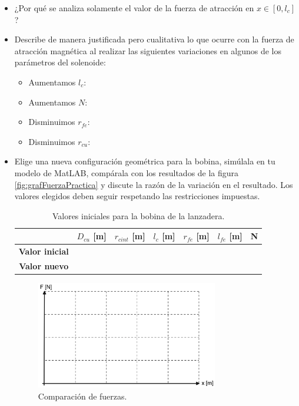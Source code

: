 \begin{itemize}
    \item ¿Por qué se analiza solamente el valor de la fuerza de atracción en \(x \in [0, l_c]\)?
    \vspace{2cm}
    \item Describe de manera justificada pero cualitativa lo que ocurre con la fuerza de atracción magnética al realizar las siguientes variaciones en algunos de los parámetros del solenoide:
    \begin{itemize}
        \item Aumentamos \(l_c\):
        \item Aumentamos \(N\):
        \item Disminuimos \(r_{fe}\):
        \item Disminuimos \(r_{cu}\):
    \end{itemize}
    \item Elige una nueva configuración geométrica para la bobina, simúlala en tu modelo de MatLAB, compárala con los resultados de la figura \ref{fig:grafFuerzaPractica} y discute la razón de la variación en el resultado. Los valores elegidos deben seguir respetando las restricciones impuestas.
    
    \begin{table}[H]
        \centering
        \setlength{\tabcolsep}{5pt}
        \renewcommand{\arraystretch}{1.2}
        \begin{tabular}{|c|c|c|c|c|c|c|}
            \hline
            \hbox{} & \textbf{\(D_{cu}\) [m]} & \textbf{\(r_{cint}\) [m]} & \textbf{\(l_c\) [m]} & \textbf{\(r_{fe}\) [m]} & \textbf{\(l_{fe}\) [m]} & \textbf{N} \\
            \hline
            \textbf{Valor inicial} &  &  &  &  &  &  \\
            \hline
            \textbf{Valor nuevo} &  &  &  &  &  &  \\
            \hline
        \end{tabular}
        \caption{Valores iniciales para la bobina de la lanzadera.}
        \label{tab:bobIniPractica2}
    \end{table}

    \begin{figure}[H]
        \centering 
        \includegraphics[width=0.75\textwidth]{FigurasMemoria/grafFuerzaPractica.png}
        \caption{Comparación de fuerzas.}
        \label{fig:grafFuerzaPracticaEjercicio} %
    \end{figure}
    
\end{itemize}


